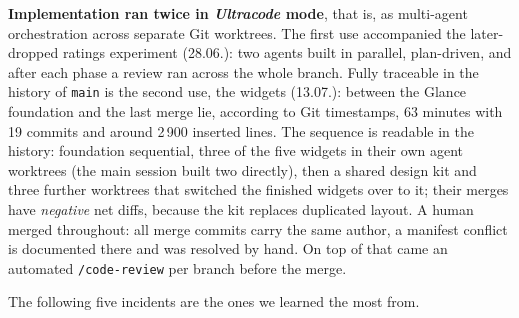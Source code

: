 \documentclass{msereport}
\begin{document}
\textbf{Implementation ran twice in \emph{Ultracode} mode}, that is, as
multi-agent orchestration across separate Git worktrees. The first use
accompanied the later-dropped ratings experiment (28.06.): two agents built in
parallel, plan-driven, and after each phase a review ran across the whole branch.
Fully traceable in the history of \texttt{main} is the second use, the widgets
(13.07.): between the Glance foundation and the last merge lie, according to Git
timestamps, 63 minutes with 19 commits and around 2\,900 inserted lines. The
sequence is readable in the history: foundation sequential, three of the five
widgets in their own agent worktrees (the main session built two directly), then
a shared design kit and three further worktrees that switched the finished
widgets over to it; their merges have \emph{negative} net diffs, because the kit
replaces duplicated layout. A human merged throughout: all merge commits carry
the same author, a manifest conflict is documented there and was resolved by
hand. On top of that came an automated \texttt{/code-review} per branch before
the merge.

The following five incidents are the ones we learned the most from.

\msevspace{6pt}\mseblank
\end{document}
